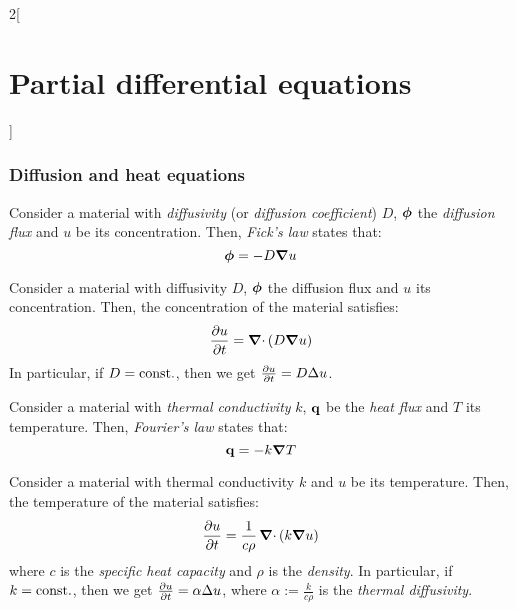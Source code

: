 \documentclass[../../../main_math.tex]{subfiles}
\begin{document}
\begin{multicols}{2}[\section{Partial differential equations}]
  \subsubsection{Diffusion and heat equations}
  \begin{proposition}
    Consider a material with \emph{diffusivity} (or \emph{diffusion coefficient}) $D$, $\boldsymbol{\mathrm{\phi}}$ the \emph{diffusion flux} and $u$ be its concentration. Then, \emph{Fick's law} states that: $$\boldsymbol{\mathrm{\phi}}=-D\grad{u}$$
  \end{proposition}
  \begin{proposition}
    Consider a material with diffusivity $D$, $\boldsymbol{\mathrm{\phi}}$ the diffusion flux and $u$ its concentration. Then, the concentration of the material satisfies: $$\pdv{u}{t}=\operatorname{\boldsymbol{\mathrm{\nabla}}\cdot}\left(D\grad{u}\right)$$
    In particular, if $D=\text{const.}$, then we get $\pdv{u}{t}=D\Delta{u}$.
  \end{proposition}
  \begin{proposition}
    Consider a material with \emph{thermal conductivity} $k$, $\boldsymbol{\mathrm{q}}$ be the \emph{heat flux} and $T$ its temperature. Then, \emph{Fourier's law} states that: $$\boldsymbol{\mathrm{q}}=-k\grad{T}$$
  \end{proposition}
  \begin{proposition}
    Consider a material with thermal conductivity $k$ and $u$ be its temperature. Then, the temperature of the material satisfies: $$\pdv{u}{t}=\frac{1}{c\rho}\operatorname{\boldsymbol{\mathrm{\nabla}}\cdot}\left(k\grad{u}\right)$$
    where $c$ is the \emph{specific heat capacity} and $\rho$ is the \emph{density}. In particular, if $k=\text{const.}$, then we get $\pdv{u}{t}=\alpha\Delta{u}$, where $\alpha:=\frac{k}{c\rho}$ is the \emph{thermal diffusivity}.
  \end{proposition}

\end{multicols}
\end{document}
